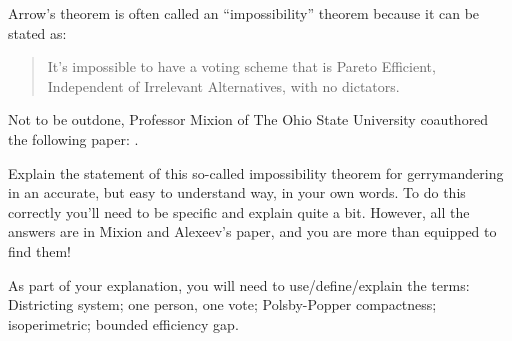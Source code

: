 \documentclass[nooutcomes,noauthor,hints,handout,12pt]{ximera}
\begin{document}
\begin{question}
  Arrow's theorem is often called an ``impossibility'' theorem because it
  can be stated as:
  \begin{quote}
    It's impossible to have a voting scheme that is Pareto Efficient,
    Independent of Irrelevant Alternatives, with no dictators.
  \end{quote}
  Not to be outdone, Professor Mixion of The Ohio State University
  coauthored the following paper: .


  Explain the statement of this so-called impossibility theorem for
  gerrymandering in an accurate, but easy to understand way, in your
  own words. To do this correctly you'll need to be specific and
  explain quite a bit. However, all the answers are in Mixion and
  Alexeev's paper, and you are more than equipped to find them!
  \begin{hint}
    As part of your explanation, you will need to use/define/explain
    the terms: Districting system; one person, one vote; Polsby-Popper
    compactness; isoperimetric; bounded efficiency gap.
  \end{hint}
\end{question}
\end{document}
